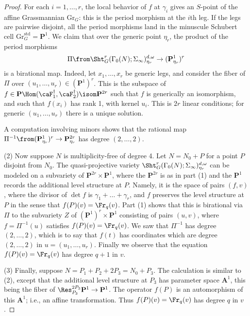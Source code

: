 \documentclass{article}
\def\P{\mathbf{P}}
\begin{document}
\begin{proof}
For each $i=1,\dots,r$, the local behavior of $f$ at $\gamma_i$ gives an $S$-point of the affine Grassmannian $\mathrm{Gr}_G$: this is the period morphism at the $i$th leg.  If the legs are pairwise disjoint, all the period morphisms land in the minuscule Schubert cell $\mathrm{Gr}_G^{\mathrm{std}}=\P^1$.  We claim that over the generic point $\eta_r$, the product of the period morphisms
\[\Pi\from \Sht^r_G(\Gamma_0(N);\Sigma_\infty)^{d,\omega}_{\eta_r}\to (\P^1_{\eta_r})^r \]
is a birational map.  Indeed, let $x_1,\dots,x_r$ be generic legs, and consider the fiber of $\Pi$ over $(u_1,\dots,u_r)\in (\P^1)^r$.  This is the subspace of $f\in \P\Hom(\caF_1^\dagger,\caF_2^\dagger)\isom \P^{2r}$ such that $f$ is generically an isomorphism, and such that $f(x_i)$ has rank 1, with kernel $u_i$.  This is $2r$ linear conditions; for generic $(u_1,\dots,u_r)$ there is a unique solution.

A computation involving minors shows that the rational map $\Pi^{-1}\from (\P^1_{\eta_r})^r\to \P_{\eta_r}^{2r}$ has degree $(2,\dots,2)$.

(2) Now suppose $N$ is multiplicity-free of degree 4.  Let $N=N_0+P$ for a point $P$ disjoint from $N_0$.  The quasi-projective variety $\Sht^r_G(\Gamma_0(N);\Sigma_\infty)_{\eta_r}^{d,\omega}$ can be modeled on a subvariety of $\P^{2r}\times\P^1$, where the $\P^{2r}$ is as in part (1) and the $\P^1$ records the additional level structure at $P$.  Namely, it is the space of pairs $(f,v)$, where the divisor of $\det f$ is $\gamma_1+\dots+\gamma_r$, and $f$ preserves the level structure at $P$ in the sense that $f(P)(v)=\Fr_q(v)$.  Part (1) shows that this is birational via $\Pi$ to the subvariety $Z$ of $(\P^1)^r\times \P^1$ consisting of pairs $(u,v)$, where $f=\Pi^{-1}(u)$ satisfies $f(P)(v)=\Fr_q(v)$.  We saw that $\Pi^{-1}$ has degree $(2,\dots,2)$, which is to say that $f(t)$ has coordinates which are degree $(2,\dots,2)$ in $u=(u_1,\dots,u_r)$.  Finally we observe that the equation $f(P)(v)=\Fr_q(v)$ has degree $q+1$ in $v$. 

(3) Finally, suppose $N=P_1+P_2+2P_3=N_0+P_3$.  The calculation is similar to (2), except that the additional level structure at $P_3$ has parameter space $\mathbf{A}^1$, this being the fiber of $\Res^{2P_3}_{P_3} \P^1\to \P^1$.  The operator $f(P)$ is an automorphism of this $\mathbf{A}^1$; i.e., an affine transformation.  Thus $f(P)(v)=\Fr_q(v)$ has degree $q$ in $v$.
\end{proof}
\end{document}
